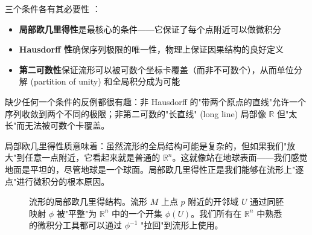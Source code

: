 \begin{remark}[为什么需要这三个条件？]
三个条件各有其必要性 \cite{Morita2022,Tu2013}：
\begin{itemize}
    \item \textbf{局部欧几里得性}是最核心的条件——它保证了每个点附近可以做微积分
    \item \textbf{Hausdorff 性}确保序列极限的唯一性，物理上保证因果结构的良好定义
    \item \textbf{第二可数性}保证流形可以被可数个坐标卡覆盖（而非不可数个），从而单位分解 (partition of unity) 和全局积分成为可能
\end{itemize}
缺少任何一个条件的反例都很有趣：非 Hausdorff 的"带两个原点的直线"允许一个序列收敛到两个不同的极限；非第二可数的"长直线" (long line) 局部像 $\mathbb{R}$ 但"太长"而无法被可数个卡覆盖。
\end{remark}

\begin{remark}
局部欧几里得性质意味着：虽然流形的全局结构可能是复杂的，但如果我们"放大"到任意一点附近，它看起来就是普通的 $\mathbb{R}^n$。这就像站在地球表面——我们感觉地面是平坦的，尽管地球是一个球面。局部欧几里得性正是我们能够在流形上"逐点"进行微积分的根本原因。
\end{remark}

\begin{figure}[htbp]
\centering
{}
\caption{流形的局部欧几里得结构。流形 $M$ 上点 $p$ 附近的开邻域 $U$ 通过同胚映射 $\phi$ 被"平整"为 $\mathbb{R}^n$ 中的一个开集 $\phi(U)$。我们所有在 $\mathbb{R}^n$ 中熟悉的微积分工具都可以通过 $\phi^{-1}$ "拉回"到流形上使用。}
\label{fig:manifold_local_euclidean}
\end{figure}


